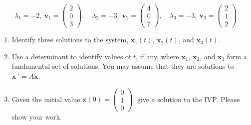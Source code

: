 \documentclass[12pt]{exam}
\begin{document}
\begin{questions}
    
    
    $$ %
    \lambda_1 = -2, \ \mathbf v_1 = \begin{pmatrix} 2 \\ 0 \\ 3 \end{pmatrix},
    \quad \lambda _2 = -3 , \  \mathbf v_2 = \begin{pmatrix} 4 \\ 0 \\ 7 \end{pmatrix}, 
    \quad \lambda _3 = -3 , \  \mathbf v_3 = \begin{pmatrix} 2 \\ 1 \\ 2 \end{pmatrix} 
    $$    

    
    \begin{enumerate}[label=\roman*)]
      \item Identify three solutions to the system, $\mathbf x_1(t)$, $\mathbf x_2(t)$, and $\mathbf x_3(t)$. 
      \vspace{3cm} 
      \item Use a determinant to identify values of $t$, if any, where $\mathbf x_1$, $\mathbf x_2$, and $\mathbf x_3$ form a fundamental set of solutions. You may assume that they are solutions to $\mathbf x \, ' = A\mathbf x$. 
      \vspace{3cm}
      \item Given the initial value $\mathbf x(0) = \begin{pmatrix}0\\1\\0\end{pmatrix}$, give a solution to the IVP. Please show your work. 
      

\end{enumerate}
\end{questions}
\end{document}
